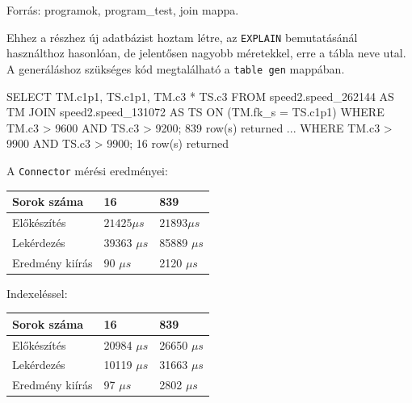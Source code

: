 Forrás: programok, program\_test, join mappa.

Ehhez a részhez új adatbázist hoztam létre, az \texttt{EXPLAIN} bemutatásánál használthoz hasonlóan, de jelentősen nagyobb méretekkel, erre a tábla neve utal.
A generáláshoz szükséges kód megtalálható a \texttt{table gen} mappában.

\begin{python}
SELECT TM.c1p1, TS.c1p1, TM.c3 * TS.c3
FROM speed2.speed_262144 AS TM 
JOIN speed2.speed_131072 AS TS ON (TM.fk_s = TS.c1p1) 
WHERE TM.c3 > 9600 AND TS.c3 > 9200; 
	839 row(s) returned
...
WHERE TM.c3 > 9900 AND TS.c3 > 9900; 
	16 row(s) returned
\end{python}

A \texttt{Connector} mérési eredményei:

\begin{table}[h!]
\centering
\begin{tabular}{|p{6cm}|p{3cm}|p{3cm}|}
\hline
Sorok száma & 16 & 839 \\
\hline\hline

Előkészítés & $21425 \mu s$ & $21893 \mu s$ \\
\hline

Lekérdezés & 39363 $\mu s$ & 85889 $\mu s$ \\
\hline

Eredmény kiírás & 90 $\mu s$ & 2120 $\mu s$ \\
\hline

\end{tabular}
\end{table}

\newpage

Indexeléssel:

\begin{table}[h!]
\centering
\begin{tabular}{|p{6cm}|p{3cm}|p{3cm}|}
\hline
Sorok száma & 16 & 839 \\
\hline
\hline

Előkészítés & 20984 $\mu s$ & 26650 $\mu s$ \\
\hline

Lekérdezés & 10119 $\mu s$ & 31663 $\mu s$ \\
\hline

Eredmény kiírás & 97 $\mu s$ & 2802 $\mu s$ \\
\hline

\end{tabular}
\end{table}

